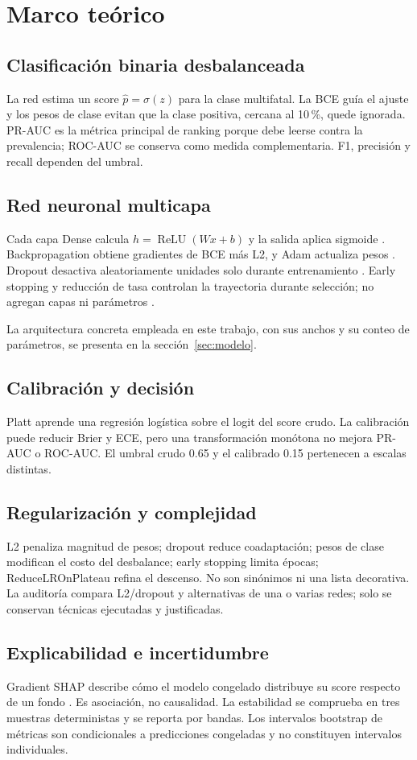 \section{Marco teórico}\label{sec:marco}

\subsection{Clasificación binaria desbalanceada}
La red estima un score $\hat p=\sigma(z)$ para la clase multifatal. La BCE guía el ajuste y los pesos de clase evitan que la clase positiva, cercana al 10\,\%, quede ignorada. PR-AUC es la métrica principal de ranking porque debe leerse contra la prevalencia; ROC-AUC se conserva como medida complementaria. F1, precisión y recall dependen del umbral.

\subsection{Red neuronal multicapa}
Cada capa Dense calcula $h=\operatorname{ReLU}(Wx+b)$ y la salida aplica sigmoide \cite{goodfellow_deep_learning_2016}. Backpropagation obtiene gradientes de BCE más L2, y Adam actualiza pesos \cite{kingma_adam_2014}. Dropout desactiva aleatoriamente unidades solo durante entrenamiento \cite{srivastava_dropout_2014}. Early stopping y reducción de tasa controlan la trayectoria durante selección; no agregan capas ni parámetros \cite{prechelt_early_stopping_1998}.

La arquitectura concreta empleada en este trabajo, con sus anchos y su conteo de parámetros, se presenta en la sección~\ref{sec:modelo}.

\subsection{Calibración y decisión}
Platt aprende una regresión logística sobre el logit del score crudo. La calibración puede reducir Brier y ECE, pero una transformación monótona no mejora PR-AUC o ROC-AUC. El umbral crudo 0.65 y el calibrado 0.15 pertenecen a escalas distintas.

\subsection{Regularización y complejidad}
L2 penaliza magnitud de pesos; dropout reduce coadaptación; pesos de clase modifican el costo del desbalance; early stopping limita épocas; ReduceLROnPlateau refina el descenso. No son sinónimos ni una lista decorativa. La auditoría compara L2/dropout y alternativas de una o varias redes; solo se conservan técnicas ejecutadas y justificadas.

\subsection{Explicabilidad e incertidumbre}
Gradient SHAP describe cómo el modelo congelado distribuye su score respecto de un fondo \cite{lundberg_shap_2017}. Es asociación, no causalidad. La estabilidad se comprueba en tres muestras deterministas y se reporta por bandas. Los intervalos bootstrap de métricas son condicionales a predicciones congeladas y no constituyen intervalos individuales.
